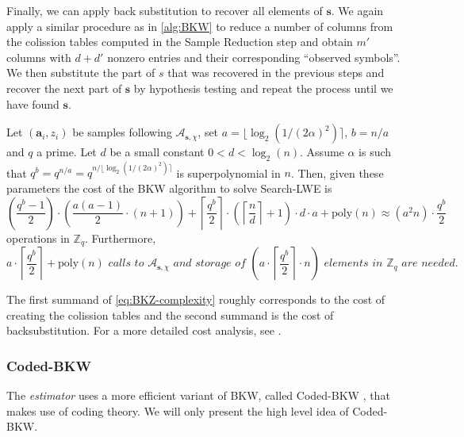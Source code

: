 
Finally, we can apply back substitution to recover all elements of $\mathbf{s}$. We again apply a similar procedure as in \cref{alg:BKW} to reduce a number of columns from the colission tables computed in the Sample Reduction step and obtain $m'$ columns with $d+d'$ nonzero entries and their corresponding ``observed symbols''. We then substitute the part of $s$ that was recovered in the previous steps and recover the next part of $\mathbf{s}$ by hypothesis testing and repeat the process until we have found $\mathbf{s}$.


\begin{theorem}
  Let $(\mathbf{a}_i, z_i)$ be samples following $\mathcal{A}_{\mathbf{s}, \chi}$, set $a = \lfloor \log_2(1/(2\alpha)^2)\rceil$, $b = n/a$ and $q$ a prime. Let $d$ be a small constant $0 < d < \log_2(n)$. Assume $\alpha$ is such that $q^b = q^{n/a} = q^{n/\lfloor \log_2(1/(2\alpha)^2)\rceil}$ is superpolynomial in $n$. Then, given these parameters the cost of the BKW algorithm to solve Search-LWE is
  \begin{equation}\label{eq:BKZ-complexity}
    \left(\frac{q^b-1}{2}\right) \cdot \left(\frac{a(a-1)}{2} \cdot (n + 1) \right) + \left\lceil\frac{q^b}{2}\right\rceil \cdot \left(\left\lceil\frac{n}{d}\right\rceil + 1\right) \cdot d \cdot a + \text{poly}(n) \approx (a^2 n) \cdot \frac{q^b}{2}
  \end{equation}
  operations in $\mathbb{Z}_q$. Furthermore,
  \begin{equation}
    a \cdot \left\lceil\frac{q^b}{2}\right\rceil + \text{poly}(n)\textit{ calls to } \mathcal{A}_{\mathbf{s}, \chi}\textit{ and storage of }  \left(a \cdot \left\lceil\frac{q^b}{2}\right\rceil \cdot n\right) \textit{ elements in } \mathbb{Z}_q \textit{ are needed.}
  \end{equation}
\end{theorem}

The first summand of \cref{eq:BKZ-complexity} roughly corresponds to the cost of creating the colission tables and the second summand is the cost of backsubstitution. For a more detailed cost analysis, see \cite[Theorem~2]{ACFFP15a}.


\subsubsection*{Coded-BKW \cite{GJS15}}
The \textit{estimator} uses a more efficient variant of BKW, called Coded-BKW \cite{GJS15}, that makes use of coding theory. We will only present the high level idea of Coded-BKW.

